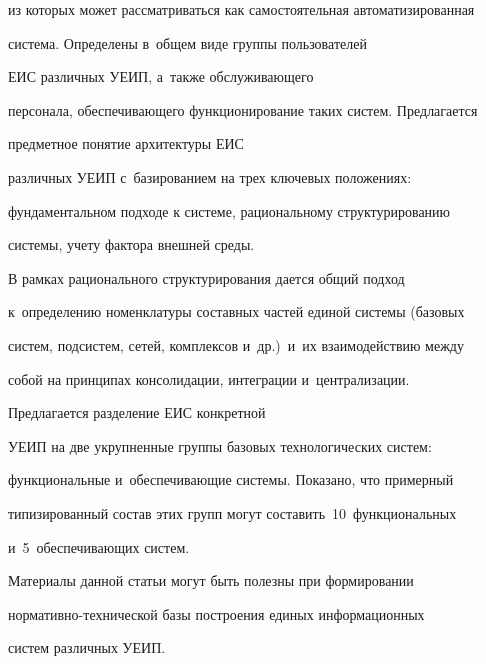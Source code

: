 из которых может рассматриваться как самостоятельная автоматизированная 

система. Определены в~общем виде группы пользователей 

ЕИС различных УЕИП, а~также обслуживающего 

персонала, обеспечивающего функционирование таких систем. Предлагается 

предметное понятие архитектуры ЕИС

различных УЕИП с~базированием на трех ключевых положениях: 

фундаментальном подходе к системе, рациональному структурированию 

системы, учету фактора внешней среды.

     

     В рамках рационального структурирования дается общий подход 

к~определению номенклатуры составных частей единой системы (базовых 

сис\-тем, под\-сис\-тем, сетей, комплексов и~др.)\ и~их взаимодействию между 

собой на принципах консолидации, интеграции и~централизации.

     

     Предлагается разделение ЕИС конкретной 

УЕИП на две укрупненные группы базовых технологических сис\-тем: 

функциональные и~обеспечивающие сис\-те\-мы. Показано, что примерный 

типизированный со\-став этих групп могут со\-ста\-вить~10~функциональных 

и~5~обеспечивающих систем.

     

     Материалы данной статьи могут быть полезны при формировании  

нор\-ма\-тив\-но-тех\-ни\-че\-ской базы построения единых информационных 

систем различных УЕИП.

     

